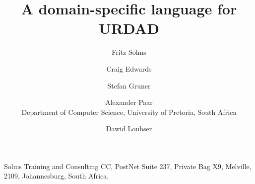 \documentclass[11pt]{article}
\begin{document}
\title{A domain-specific language for URDAD}
\author{Fritz Solms \and Craig Edwards \and Stefan Gruner \and Alexander Paar
\\ Department of Computer Science, University of Pretoria, South Africa}
\author{Dawid Loubser}
 Solms Training and Consulting CC, PostNet Suite 237, Private Bag X9, Melville, 2109, Johannesburg, South Africa.

\maketitle



\listoftodos




















 

\end{document}
